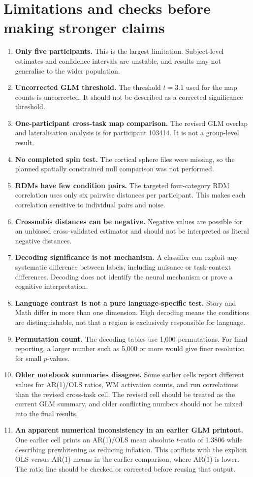 \documentclass[11pt,a4paper]{article}
\begin{document}
\section{Limitations and checks before making stronger claims}

\begin{enumerate}
    \item \textbf{Only five participants.} This is the largest limitation. Subject-level estimates and confidence intervals are unstable, and results may not generalise to the wider population.
    \item \textbf{Uncorrected GLM threshold.} The threshold \(t=3.1\) used for the map counts is uncorrected. It should not be described as a corrected significance threshold.
    \item \textbf{One-participant cross-task map comparison.} The revised GLM overlap and lateralisation analysis is for participant 103414. It is not a group-level result.
    \item \textbf{No completed spin test.} The cortical sphere files were missing, so the planned spatially constrained null comparison was not performed.
    \item \textbf{RDMs have few condition pairs.} The targeted four-category RDM correlation uses only six pairwise distances per participant. This makes each correlation sensitive to individual pairs and noise.
    \item \textbf{Crossnobis distances can be negative.} Negative values are possible for an unbiased cross-validated estimator and should not be interpreted as literal negative distances.
    \item \textbf{Decoding significance is not mechanism.} A classifier can exploit any systematic difference between labels, including nuisance or task-context differences. Decoding does not identify the neural mechanism or prove a cognitive interpretation.
    \item \textbf{Language contrast is not a pure language-specific test.} Story and Math differ in more than one dimension. High decoding means the conditions are distinguishable, not that a region is exclusively responsible for language.
    \item \textbf{Permutation count.} The decoding tables use 1,000 permutations. For final reporting, a larger number such as 5,000 or more would give finer resolution for small \(p\)-values.
    \item \textbf{Older notebook summaries disagree.} Some earlier cells report different values for AR(1)/OLS ratios, WM activation counts, and run correlations than the revised cross-task cell. The revised cell should be treated as the current GLM summary, and older conflicting numbers should not be mixed into the final results.
    \item \textbf{An apparent numerical inconsistency in an earlier GLM printout.} One earlier cell prints an AR(1)/OLS mean absolute \(t\)-ratio of 1.3806 while describing prewhitening as reducing inflation. This conflicts with the explicit OLS-versus-AR(1) means in the earlier comparison, where AR(1) is lower. The ratio line should be checked or corrected before reusing that output.
\end{enumerate}
\end{document}
